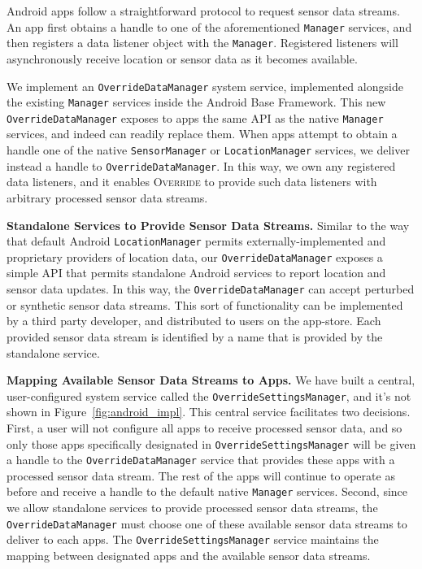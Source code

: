 \documentclass[10pt]{sensys-proc}
\begin{document}
Android apps follow a straightforward protocol to request sensor data streams. An app first obtains a handle to one of the aforementioned \texttt{Manager} services, and then registers a data listener object with the \texttt{Manager}. Registered listeners will asynchronously receive location or sensor data as it becomes available.

We implement an \texttt{OverrideDataManager} system service, implemented alongside the existing \texttt{Manager} services inside the Android Base Framework. This new \texttt{OverrideDataManager} exposes to apps the same API as the native \texttt{Manager} services, and indeed can readily replace them. When apps attempt to obtain a handle one of the native \texttt{SensorManager} or \texttt{LocationManager} services, we deliver instead a handle to \texttt{OverrideDataManager}. In this way, we own any registered data listeners, and it enables \textsc{Override} to provide such data listeners with arbitrary processed sensor data streams.

\textbf{Standalone Services to Provide Sensor Data Streams.} Similar to the way that default Android \texttt{LocationManager} permits externally-implemented and proprietary providers of location data, our \texttt{OverrideDataManager} exposes a simple API that permits standalone Android services to report location and sensor data updates. In this way, the \texttt{OverrideDataManager} can accept perturbed or synthetic sensor data streams. This sort of functionality can be implemented by a third party developer, and distributed to users on the app-store. Each provided sensor data stream is identified by a name that is provided by the standalone service.

\textbf{Mapping Available Sensor Data Streams to Apps.} We have built a central, user-configured system service called the \texttt{OverrideSettingsManager}, and it's not shown in Figure~\ref{fig:android_impl}. This central service facilitates two decisions. First, a user will not configure all apps to receive processed sensor data, and so only those apps specifically designated in \texttt{OverrideSettingsManager} will be given a handle to the \texttt{OverrideDataManager} service that provides these apps with a processed sensor data stream. The rest of the apps will continue to operate as before and receive a handle to the default native \texttt{Manager} services. Second, since we allow standalone services to provide processed sensor data streams, the \texttt{OverrideDataManager} must choose one of these available sensor data streams to deliver to each apps. The \texttt{OverrideSettingsManager} service maintains the mapping between designated apps and the available sensor data streams.
\end{document}

